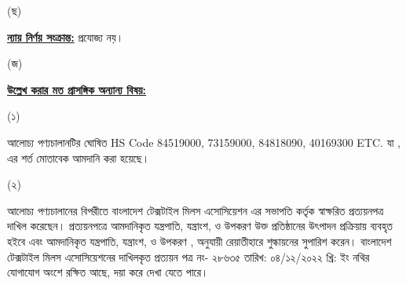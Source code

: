 \documentclass[12pt]{article}
\newcommand{\hscode}{84519000, 73159000, 84818090, 40169300 ETC.}
\newcommand{\btmaltno}{প্রত্যয়ন পত্র নং- ২৮৬৩৫}
\newcommand{\btmaltnodt}{তারিখ:  ০৪/১২/২০২২ খ্রি:}
\begin{document}
\begin{minipage}[t]{0.05\linewidth}
(ছ)
\end{minipage}
\begin{minipage}[t]{0.90\linewidth}
\underline{\textbf{ন্যায় নির্ণয় সংক্রান্ত:}} প্রযোজ্য নয়।
\\
\end{minipage}
\begin{minipage}[t]{0.05\linewidth}
\hspace{1em}
\end{minipage}
\begin{minipage}[t]{0.05\linewidth}
(জ)
\end{minipage}
\begin{minipage}[t]{0.05\linewidth}
\end{minipage}
\begin{minipage}[t]{0.90\linewidth}
\underline{\textbf{উল্লেখ করার মত প্রাসঙ্গিক অন্যান্য বিষয়:}}
\end{minipage}
\footnotesize
\begin{minipage}[t]{0.05\linewidth}
\hspace{1em}
\end{minipage}
\begin{minipage}[t]{0.05\linewidth}
\hspace{1em}
\end{minipage}
\begin{minipage}[t]{0.05\linewidth}
(১)
\end{minipage}
\begin{minipage}[t]{0.85\linewidth}
আলোচ্য পণ্যচালানটির ঘোষিত HS Code {\hscode}
যা {\srooot}, {\sroootd} এর শর্ত মোতাবেক
আমদানি করা হয়েছে।
\end{minipage}
\begin{minipage}[t]{0.05\linewidth}
\hspace{1em}
\end{minipage}
\begin{minipage}[t]{0.05\linewidth}
\hspace{1em}
\end{minipage}
\begin{minipage}[t]{0.05\linewidth}
(২)
\end{minipage}
\begin{minipage}[t]{0.85\linewidth}
আলোচ্য পণ্যচালানের বিপরীতে বাংলাদেশ
টেক্সটাইল মিলস এসোসিয়েশন এর সভাপতি
কর্তৃক স্বাক্ষরিত প্রত্যয়নপত্র
দাখিল করেছেন। প্রত্যয়নপত্রে আমদানিকৃত
যন্ত্রপাতি, যন্ত্রাংশ, ও উপকরণ
উক্ত প্রতিষ্ঠানের উৎপাদন প্রক্রিয়ায়
ব্যবহৃত হইবে এবং আমদানিকৃত
যন্ত্রপাতি, যন্ত্রাংশ, ও উপকরণ
{\srooot}, {\sroootd} অনুযায়ী
রেয়াতীহারে শুল্কায়নের সুপারিশ
করেন। বাংলাদেশ টেক্সটাইল মিলস
এসোসিয়েশনের দাখিলকৃত {\btmaltno}
{\btmaltnodt} ইং নথির যোগাযোগ অংশে রক্ষিত
আছে, দয়া করে দেখা যেতে পারে।
\end{minipage}
\end{document}

